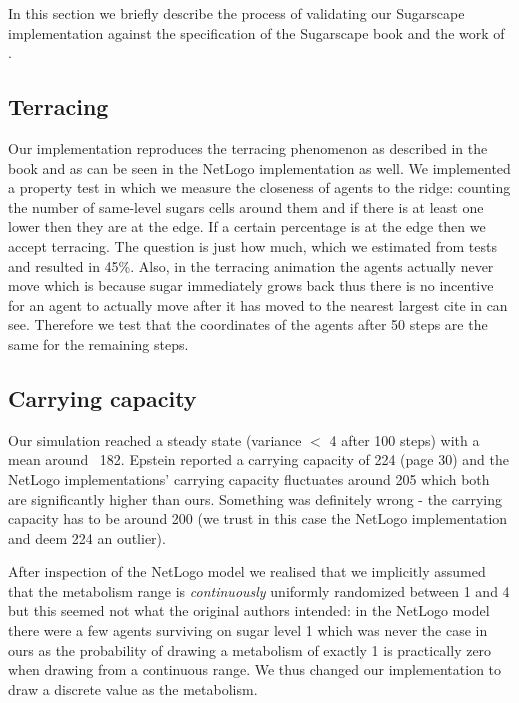 In this section we briefly describe the process of validating our Sugarscape implementation against the specification of the Sugarscape book \cite{epstein_growing_1996} and the work of \cite{weaver_replicating_2009}.

\subsection{Terracing}
Our implementation reproduces the terracing phenomenon as described in the book and as can be seen in the NetLogo implementation as well. We implemented a property test in which we measure the closeness of agents to the ridge: counting the number of same-level sugars cells around them and if there is at least one lower then they are at the edge. If a certain percentage is at the edge then we accept terracing. The question is just how much, which we estimated from tests and resulted in 45\%. Also, in the terracing animation the agents actually never move which is because sugar immediately grows back thus there is no incentive for an agent to actually move after it has moved to the nearest largest cite in can see. Therefore we test that the coordinates of the agents after 50 steps are the same for the remaining steps.

\subsection{Carrying capacity}
Our simulation reached a steady state (variance $<$ 4 after 100 steps) with a mean around ~182. Epstein reported a carrying capacity of 224 (page 30) and the NetLogo implementations' \cite{weaver_replicating_2009} carrying capacity fluctuates around 205 which both are significantly higher than ours. Something was definitely wrong - the carrying capacity has to be around 200 (we trust in this case the NetLogo implementation and deem 224 an outlier).

After inspection of the NetLogo model we realised that we implicitly assumed that the metabolism range is \textit{continuously} uniformly randomized between 1 and 4 but this seemed not what the original authors intended: in the NetLogo model there were a few agents surviving on sugar level 1 which was never the case in ours as the probability of drawing a metabolism of exactly 1 is practically zero when drawing from a continuous range. We thus changed our implementation to draw a discrete value as the metabolism. %

